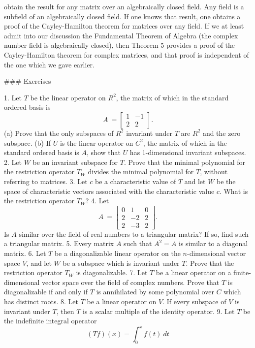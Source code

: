 obtain the result for any matrix over an algebraically closed field. Any field is a subfield of an algebraically closed field. If one knows that result, one obtains a proof of the Cayley-Hamilton theorem for matrices over any field. If we at least admit into our discussion the Fundamental Theorem of Algebra (the complex number field is algebraically closed), then Theorem 5 provides a proof of the Cayley-Hamilton theorem for complex matrices, and that proof is independent of the one which we gave earlier.

### Exercises

1. Let \(T\) be the linear operator on \(R^{2}\), the matrix of which in the standard ordered basis is \[A\ =\begin{bmatrix}1&-1\\ 2&2\end{bmatrix}.\] (a) Prove that the only subspaces of \(R^{2}\) invariant under \(T\) are \(R^{2}\) and the zero subspace. (b) If \(U\) is the linear operator on \(C^{2}\), the matrix of which in the standard ordered basis is \(A\), show that \(U\) has 1-dimensional invariant subspaces. 2. Let \(W\) be an invariant subspace for \(T\). Prove that the minimal polynomial for the restriction operator \(T_{W}\) divides the minimal polynomial for \(T\), without referring to matrices. 3. Let \(c\) be a characteristic value of \(T\) and let \(W\) be the space of characteristic vectors associated with the characteristic value \(c\). What is the restriction operator \(T_{W}\)? 4. Let \[A\ =\begin{bmatrix}0&1&0\\ 2&-2&2\\ 2&-3&2\end{bmatrix}.\] Is \(A\) similar over the field of real numbers to a triangular matrix? If so, find such a triangular matrix. 5. Every matrix \(A\) such that \(A^{2}=A\) is similar to a diagonal matrix. 6. Let \(T\) be a diagonalizable linear operator on the \(n\)-dimensional vector space \(V\), and let \(W\) be a subspace which is invariant under \(T\). Prove that the restriction operator \(T_{W}\) is diagonalizable. 7. Let \(T\) be a linear operator on a finite-dimensional vector space over the field of complex numbers. Prove that \(T\) is diagonalizable if and only if \(T\) is annihilated by some polynomial over \(C\) which has distinct roots. 8. Let \(T\) be a linear operator on \(V\). If every subspace of \(V\) is invariant under \(T\), then \(T\) is a scalar multiple of the identity operator. 9. Let \(T\) be the indefinite integral operator \[(T\!f)(x)=\int_{0}^{x}f(t)\ dt\] 